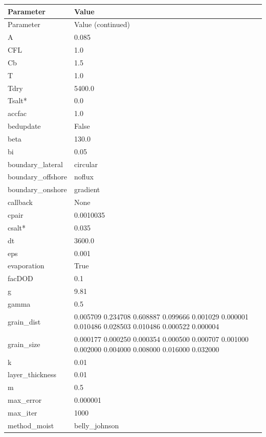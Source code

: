 \documentclass[preprint,12pt,authoryear]{elsarticle}
\begin{document}
\begin{longtable}{p{3cm} p{8cm}}
  Parameter         & Value \\
  \hline
  \endfirsthead
  Parameter         & Value \hfill (continued)\\
  \hline
  \endhead
  A                 & 0.085 \\
  CFL               & 1.0 \\
  Cb                & 1.5 \\
  T                 & 1.0 \\
  Tdry              & 5400.0 \\
  Tsalt*            & 0.0 \\
  accfac            & 1.0 \\
  bedupdate         & False \\
  beta              & 130.0 \\
  bi                & 0.05 \\
  boundary\_lateral  & circular \\
  boundary\_offshore & noflux \\
  boundary\_onshore  & gradient \\
  callback          & None \\
  cpair             & 0.0010035 \\
  csalt*            & 0.035 \\
  dt                & 3600.0 \\
  eps               & 0.001 \\
  evaporation       & True \\
  facDOD            & 0.1 \\
  g                 & 9.81 \\
  gamma             & 0.5 \\
  grain\_dist       & 0.005709 0.234708 0.608887 0.099666 0.001029 0.000001 0.010486 0.028503 0.010486 0.000522 0.000004 \\
  grain\_size       & 0.000177 0.000250 0.000354 0.000500 0.000707 0.001000 0.002000 0.004000 0.008000 0.016000 0.032000 \\
  k                 & 0.01 \\
  layer\_thickness  & 0.01 \\
  m                 & 0.5 \\
  max\_error         & 0.000001 \\
  max\_iter          & 1000 \\
  method\_moist      & belly\_johnson \\

\end{longtable}
\end{document}
